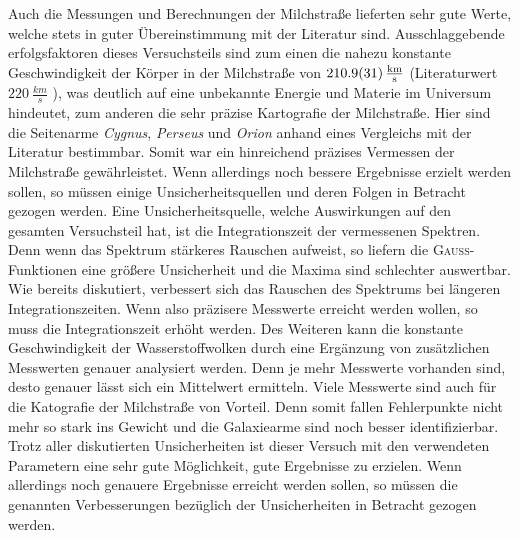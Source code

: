 Auch die Messungen und Berechnungen der Milchstraße lieferten sehr gute Werte, welche stets in guter Übereinstimmung mit der Literatur sind. 
Ausschlaggebende erfolgsfaktoren dieses Versuchsteils sind zum einen die nahezu konstante Geschwindigkeit der Körper in der Milchstraße von $\SI{210.9 \pm 3.1}{\frac{km}{s}}$ (Literaturwert $\SI{220}{\frac{km}{s}}$ \cite{LSR}), was deutlich auf eine unbekannte Energie und Materie im Universum hindeutet, zum anderen die sehr präzise Kartografie der Milchstraße.
Hier sind die Seitenarme \textit{Cygnus}, \textit{Perseus} und \textit{Orion} anhand eines Vergleichs mit der Literatur bestimmbar.
Somit war ein hinreichend präzises Vermessen der Milchstraße gewährleistet. 
Wenn allerdings noch bessere Ergebnisse erzielt werden sollen, so müssen einige Unsicherheitsquellen und deren Folgen in Betracht gezogen werden. 
Eine Unsicherheitsquelle, welche Auswirkungen auf den gesamten Versuchsteil hat, ist die Integrationszeit der vermessenen Spektren. 
Denn wenn das Spektrum stärkeres Rauschen aufweist, so liefern die \textsc{Gauss}-Funktionen eine größere Unsicherheit und die Maxima sind schlechter auswertbar. 
Wie bereits diskutiert, verbessert sich das Rauschen des Spektrums bei längeren Integrationszeiten. 
Wenn also präzisere Messwerte erreicht werden wollen, so muss die Integrationszeit erhöht werden. 
Des Weiteren kann die konstante Geschwindigkeit der Wasserstoffwolken durch eine Ergänzung von zusätzlichen Messwerten genauer analysiert werden. 
Denn je mehr Messwerte vorhanden sind, desto genauer lässt sich ein Mittelwert ermitteln. 
Viele Messwerte sind auch für die Katografie der Milchstraße von Vorteil.
Denn somit fallen Fehlerpunkte nicht mehr so stark ins Gewicht und die Galaxiearme sind noch besser identifizierbar. \\

Trotz aller diskutierten Unsicherheiten ist dieser Versuch mit den verwendeten Parametern eine sehr gute Möglichkeit, gute Ergebnisse zu erzielen.
Wenn allerdings noch genauere Ergebnisse erreicht werden sollen, so müssen die genannten Verbesserungen bezüglich der Unsicherheiten in Betracht gezogen werden.
